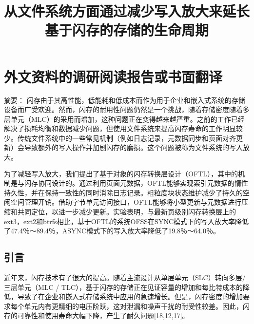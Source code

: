 


\chapter{外文资料的调研阅读报告或书面翻译}

\title{从文件系统方面通过减少写入放大来延长基于闪存的存储的生命周期}

{\heiti 摘要：} 闪存由于其高性能，低能耗和低成本而作为用于企业和嵌入式系统的存储设备而广受欢迎。然而，闪存的耐用性问题仍然是一个挑战，随着存储密度随着多层单元（MLC）的采用而增加，这种问题正在变得越来越严重。之前的工作已经解决了损耗均衡和数据减少问题，但使用文件系统来提高闪存寿命的工作明显较少。传统文件系统中的一些常见机制（例如日志记录，元数据同步和页面对齐更新）会导致额外的写入操作并加剧闪存的磨损。这个问题被称为文件系统的写入放大。

为了减轻写入放大，我们提出了基于对象的闪存转换层设计（OFTL），其中的机制是与闪存协同设计的。通过利用页面元数据，OFTL能够实现索引元数据的惰性持久性，并在保持一致性的同时消除日志记录。粗粒度块状态维护减少了持久的空闲空间管理开销。借助字节单元访问接口，OFTL能够将小型更新与元数据进行压缩和共同定位，以进一步减少更新。实验表明，与最新页级别闪存转换层上的ext3，ext2和btrfs相比，基于OFTL的系统OFSS在SYNC模式下的写入放大率降低了47.4％〜89.4％，ASYNC模式下的写入放大率降低了19.8％〜64.0％。

\section{引言}
近年来，闪存技术有了很大的提高。随着主流设计从单层单元（SLC）转向多层/三层单元（MLC / TLC），基于闪存的存储正在见证容量的增加和每比特成本的降低，导致了在企业和嵌入式存储系统中应用的急速增长。但是，闪存密度的增加要求每个单元内有更精细的电压阶跃，这对泄漏和噪声干扰的耐受性较差。因此，闪存的可靠性和使用寿命大幅下降，产生了耐久问题[18,12,17]。

